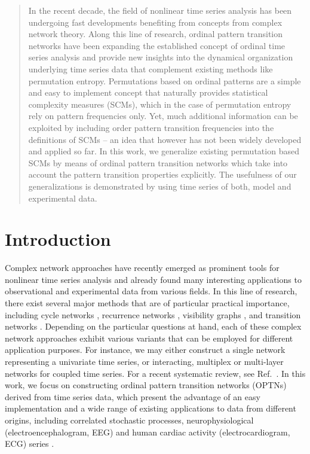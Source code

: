 \documentclass[aip,cha,reprint,nofootinbib]{revtex4-1}
\begin{document}
\maketitle

\begin{quotation}
In the recent decade, the field of nonlinear time series analysis has been undergoing fast developments benefiting from concepts from complex network theory. Along this line of research, ordinal pattern transition networks have been expanding the established concept of ordinal time series analysis and provide new insights into the dynamical organization underlying time series data that complement existing methods like permutation entropy. Permutations based on ordinal patterns are a simple and easy to implement concept that naturally provides statistical complexity measures (SCMs), which in the case of permutation entropy rely on pattern frequencies only. Yet, much additional information can be exploited by including order pattern transition frequencies into the definitions of SCMs -- an idea that however has not been widely developed and applied so far. In this work, we generalize existing permutation based SCMs by means of ordinal pattern transition networks which take into account the pattern transition properties explicitly. The usefulness of our generalizations is demonstrated by using time series of both, model and experimental data. 
\end{quotation}

\section{Introduction}
Complex network approaches \cite{ZouPR2018} have recently emerged as prominent tools for nonlinear time series analysis \cite{Kantz97,Sprott2003} and already found many interesting applications to observational and experimental data from various fields. In this line of research, there exist several major methods that are of particular practical importance, including cycle networks \cite{ZhangPRL2006}, recurrence networks \cite{MarwanPLA2009,Donner2010a}, visibility graphs \cite{Lacasa2008,Nunez2012}, and transition networks \cite{Nicolis2005,MichaelChaos2015}. Depending on the particular questions at hand, each of these complex network approaches exhibit various variants that can be employed for different application purposes. For instance, we may either construct a single network representing a univariate time series, or interacting, multiplex or multi-layer networks for coupled time series. For a recent systematic review, see Ref.~\cite{ZouPR2018}. In this work, we focus on constructing ordinal pattern transition networks (OPTNs) derived from time series data, which present the advantage of an easy implementation and a wide range of existing applications to data from different origins, including correlated stochastic processes, neurophysiological (electroencephalogram, EEG) and human cardiac activity (electrocardiogram, ECG) series \cite{MichaelChaos2015,KulpChaos2016,zhangSciRep2017,McCullough2017b,BorgesAMC2019,Subramaniyam2020}. 
\end{document}
